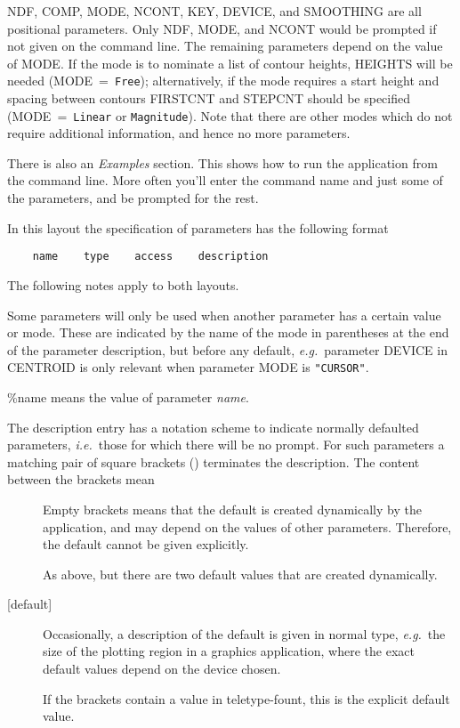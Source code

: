 {\begin{description}
NDF, COMP, MODE, NCONT, KEY, DEVICE, and SMOOTHING are all positional
parameters.  Only NDF, MODE, and NCONT would be prompted if not given
on the command line. The remaining parameters depend on the value of
MODE.  If the mode is to nominate a list of contour heights, HEIGHTS
will be needed (MODE~=~{\tt Free}); alternatively, if the mode requires a
start height and spacing between contours FIRSTCNT and STEPCNT should be
specified (MODE~=~{\tt Linear} or {\tt Magnitude}). Note that there are
other modes which do not require additional information, and hence no
more parameters. 

There is also an {\em Examples\/} section.  This shows how to run the
application from the command line.  More often you'll enter the
command name and just some of the parameters, and be prompted for
the rest.

\item [IMAGE layout]
In this layout the specification of parameters has the following format
\begin{verbatim}
    name    type    access    description
\end{verbatim}
\end{description}
\medskip

The following notes apply to both layouts.

Some parameters will only be used when another parameter has a certain
value or mode. These are indicated by the name of the mode in
parentheses at the end of the parameter description, but before any
default, {\it e.g.}\ parameter DEVICE in CENTROID is only
relevant when parameter MODE is {\tt "CURSOR"}.

{\mantt \%name} means the value of parameter {\it name}.

The description entry has a notation scheme to indicate 
normally defaulted parameters, {\it i.e.}\ those for which there will
be no prompt.
For such parameters a matching pair of square brackets ({\mantt []})
terminates the description.  The content between the brackets mean
\begin{description}
\item[{\mantt []}]
Empty brackets means that the default is created dynamically
by the application, and may depend on the values of other parameters.
Therefore, the default cannot be given explicitly.
\item[{\mantt [,]}]
As above, but there are two default values that are created dynamically.
\item[{\mantt [}{\rm default}{\mantt ]}]
Occasionally, a description of the default is given in normal type,
{\it e.g.}\ the size of the plotting region in a graphics application,
where the exact default values depend on the device chosen. 
\item[{\mantt [default]}]
If the brackets contain a value in teletype-fount, this is the explicit
default value.
\end{description}

}
